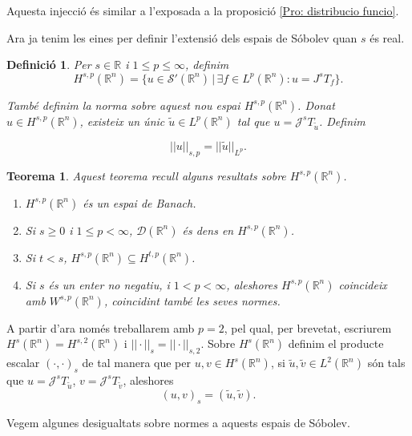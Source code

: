 \documentclass{article}
\numberwithin{equation}{section}
\newtheorem{teorema}{Teorema}[section]
\newtheorem{definicio}{Definici\'{o}}[section]
\begin{document}
Aquesta injecci\'{o} \'{e}s similar a l'exposada a la proposici\'{o} \ref{Pro: distribucio funcio}.

Ara ja tenim les eines per definir l'extensi\'{o} dels espais de S\'{o}bolev quan $s$ \'{e}s real.

\begin{definicio}
Per $s\in\mathbb{R}$ i $1\leq p\leq\infty$, definim
\begin{equation}
H^{s,p}(\mathbb{R}^n)=\{u\in\mathcal{S}'(\mathbb{R}^n)\,|\,\exists f\in L^p(\mathbb{R}^n):u=J^sT_f\}.
\end{equation}

Tamb\'{e} definim la norma sobre aquest nou espai $H^{s,p}(\mathbb{R}^n)$. Donat $u\in H^{s,p}(\mathbb{R}^n)$, existeix un \'{u}nic $\tilde{u}\in L^p(\mathbb{R}^n)$ tal que $u=\mathcal{J}^sT_{\tilde{u}}$. Definim

\begin{equation}
||u||_{s,p}=||\tilde{u}||_{L^p}.
\end{equation}
\end{definicio}

\begin{teorema}\label{Teo: Sobolev s}
Aquest teorema recull alguns resultats sobre $H^{s,p}(\mathbb{R}^n)$.
\begin{enumerate}
\item $H^{s,p}(\mathbb{R}^n)$ \'{e}s un espai de Banach.
\item Si $s\geq0$ i $1\leq p<\infty$, $\mathcal{D}(\mathbb{R}^n)$ \'{e}s dens en $H^{s,p}(\mathbb{R}^n)$.
\item Si $t<s$, $H^{s,p}(\mathbb{R}^n)\subseteq H^{t,p}(\mathbb{R}^n)$.
\item Si $s$ \'{e}s un enter no negatiu, i $1<p<\infty$, aleshores $H^{s,p}(\mathbb{R}^n)$ coincideix amb $W^{s,p}(\mathbb{R}^n)$, coincidint tamb\'{e} les seves normes.
\end{enumerate}
\end{teorema}

A partir d'ara nom\'{e}s treballarem amb $p=2$, pel qual, per brevetat, escriurem $H^s(\mathbb{R}^n)=H^{s,2}(\mathbb{R}^n)$ i $||\cdot||_s=||\cdot||_{s,2}$. Sobre $H^s(\mathbb{R}^n)$ definim el producte escalar $(\cdot,\cdot)_s$ de tal manera que per $u,v\in H^s(\mathbb{R}^n)$, si $\tilde{u},\tilde{v}\in L^2(\mathbb{R}^n)$ s\'{o}n tals que $u=\mathcal{J}^sT_{\tilde{u}}$, $v=\mathcal{J}^sT_{\tilde{v}}$, aleshores
\[(u,v)_s=(\tilde{u},\tilde{v}).\]

Vegem algunes desigualtats sobre normes a aquests espais de S\'{o}bolev.
\end{document}
